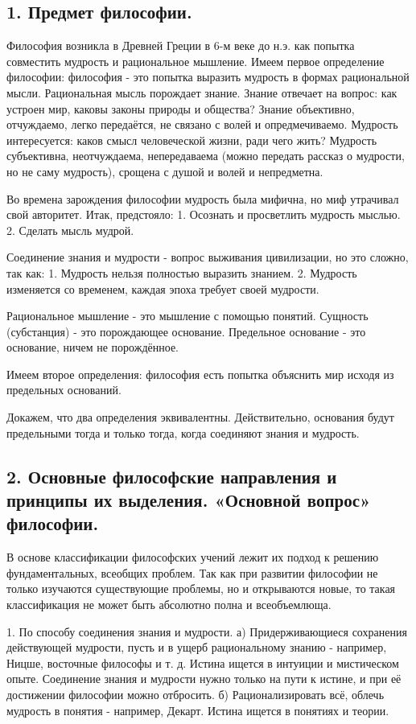 \documentclass[a4paper, 12pt]{article}
\begin{document}
\pagestyle{empty}
\subsection*{\textbf{1. Предмет философии.}}

Философия возникла в Древней Греции в 6-м веке до н.э. как попытка совместить мудрость и рациональное мышление.
Имеем первое определение философии:
философия - это попытка выразить мудрость в формах рациональной мысли.
Рациональная мысль порождает знание.
Знание отвечает на вопрос: как устроен мир, каковы законы природы и общества?
Знание объективно, отчуждаемо, легко передаётся, не связано с волей и опредмечиваемо.
Мудрость интересуется: каков смысл человеческой жизни, ради чего жить?
Мудрость субъективна, неотчуждаема, непередаваема (можно передать рассказ о мудрости, но не саму мудрость), срощена с душой и волей и непредметна.

Во времена зарождения философии мудрость была мифична, но миф утрачивал свой авторитет.
Итак, предстояло:
1. Осознать и просветлить мудрость мыслью.
2. Сделать мысль мудрой.

Соединение знания и мудрости - вопрос выживания цивилизации, но это сложно, так как:
1. Мудрость нельзя полностью выразить знанием.
2. Мудрость изменяется со временем, каждая эпоха требует своей мудрости.

Рациональное мышление - это мышление с помощью понятий.
Сущность (субстанция) - это порождающее основание.
Предельное основание - это основание, ничем не порождённое.

Имеем второе определения:
философия есть попытка объяснить мир исходя из предельных оснований.

Докажем, что два определения эквивалентны.
Действительно, основания будут предельными тогда и только тогда, когда соединяют знания и мудрость.


\subsection*{\textbf{2. Основные философские направления и принципы их выделения. «Основной вопрос» философии.}}

В основе классификации философских учений лежит их подход к решению фундаментальных, всеобщих проблем.
Так как при развитии философии не только изучаются существующие проблемы, но и открываются новые, то такая классификация не может быть абсолютно полна и всеобъемлюща.

1. По способу соединения знания и мудрости.
а) Придерживающиеся сохранения действующей мудрости, пусть и в ущерб рациональному знанию - например, Ницше, восточные философы и т. д.
Истина ищется в интуиции и мистическом опыте.
Соединение знания и мудрости нужно только на пути к истине, и при её достижении философии можно отбросить.
б) Рационализировать всё, облечь мудрость в понятия - например, Декарт.
Истина ищется в понятиях и теории.
\end{document}
